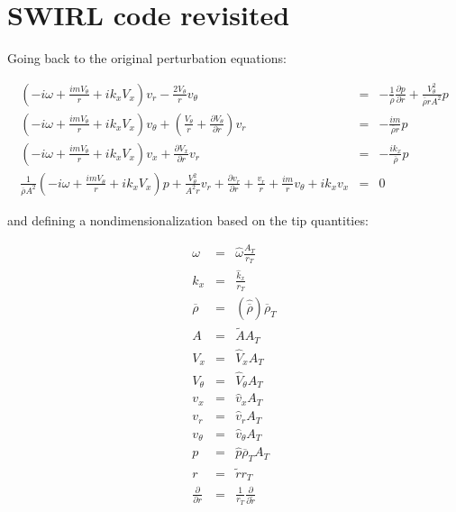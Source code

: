 \section{SWIRL code revisited}

Going back to the original perturbation equations:

\begin{eqnarray}
\left(
-i \omega
+ \frac{i m V_{\theta}}{r}
+i k_x V_x 
\right) v_r
-\frac{2 V_{\theta}}{r} v_{\theta}
&=&
-\frac{1}{\overline{\rho}} \frac{\partial p}{\partial r}
+\frac{V_{\theta}^2}{\overline{\rho} r A^2} p
\nonumber
\\
\left(
-i \omega
+ \frac{i m V_{\theta}}{r}
+i k_x V_x 
\right) v_{\theta}
+
\left(
\frac{V_{\theta}}{r}
+\frac{\partial V_{\theta}}{\partial r}
\right) v_r
&=&
-\frac{i m}{\overline{\rho} r} p
\nonumber
\\
\left(
-i \omega
+ \frac{i m V_{\theta}}{r}
+i k_x V_x 
\right) v_x
+\frac{\partial V_x}{\partial r} v_r
&=&
-\frac{i k_x}{\overline{\rho}} p
\nonumber
\\
\frac{1}{ \overline{\rho} A^2}
\left(
-i \omega
+ \frac{i m V_{\theta}}{r} 
+ i k_x V_x 
\right) p
+\frac{V_{\theta}^2}{A^2 r}
v_r
+ 
\frac{\partial v_r}{\partial r}
+ 
\frac{v_r}{r} 
+\frac{i m }{r} v_{\theta} 
+ i k_x v_x
&=&
0
\nonumber
\end{eqnarray}

and defining a nondimensionalization based on the tip quantities:

\begin{eqnarray}
\omega &=& \widehat{\omega} \frac{A_T}{r_T}
\nonumber
\\
k_x &=& \frac{\widehat{k}_x}{ r_T}
\nonumber
\\
\overline{\rho} &=& 
\left(\widehat{\overline{\rho}} \right) \overline{\rho}_T
\nonumber
\\
A &=& \widetilde{A} A_T
\nonumber
\\
V_{x} &=& \widehat{V}_{x} A_T
\nonumber
\\
V_{\theta} &=& \widehat{V}_{\theta} A_T
\nonumber
\\
v_{x} &=& \widehat{v}_{x} A_T
\nonumber
\\
v_{r} &=& \widehat{v}_{r} A_T
\nonumber
\\
v_{\theta} &=& \widehat{v}_{\theta} A_T
\nonumber
\\
p &=& \widehat{p} \overline{\rho}_T A_T
\nonumber
\\
r &=& \widetilde{r} r_T
\nonumber
\\
\frac{\partial}{\partial r} &=& \frac{1}{r_T} \frac{\partial}{\partial \widetilde{r}}
\nonumber
\end{eqnarray}

